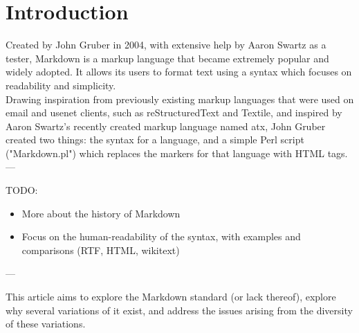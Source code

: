 \chapter{Introduction}

\vspace{1cm}

Created by John Gruber in 2004, with extensive help by Aaron Swartz as a tester, Markdown is a markup language that became extremely popular and widely adopted. It allows its users to format text using a syntax which focuses on readability and simplicity.\\

Drawing inspiration from previously existing markup languages that were used on email and usenet clients, such as reStructuredText and Textile, and inspired by Aaron Swartz's recently created markup language named atx, John Gruber created two things: the syntax for a language, and a simple Perl script ("Markdown.pl") which replaces the markers for that language with HTML tags.\\

---

TODO:

\begin{itemize}
	\item More about the history of Markdown
	\item Focus on the human-readability of the syntax, with examples and comparisons (RTF, HTML, wikitext)
\end{itemize}

---

This article aims to explore the Markdown standard (or lack thereof), explore why several variations of it exist, and address the issues arising from the diversity of these variations.